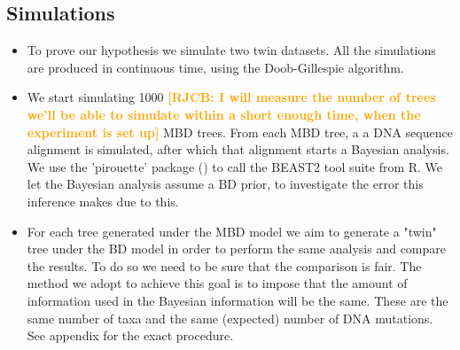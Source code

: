 \documentclass{article}
\newcommand*\richel[1]{\textcolor{orange}{\textbf{[RJCB: #1]}}}
\begin{document}
\subsection{Simulations}
\begin{itemize}

\item To prove our hypothesis we simulate two twin datasets. All the simulations are produced in continuous time, using the Doob-Gillespie algorithm. 

\item We start simulating 1000 \richel{I will measure the number of trees we'll be able to simulate within a short enough time, when the experiment is set up} MBD trees. From each MBD tree, a a DNA sequence alignment is simulated, after
which that alignment starts a Bayesian analysis. We use 
the 'pirouette' package (\cite{pirouette}) to call the BEAST2 tool 
suite from R. We let the Bayesian analysis assume a BD prior, to investigate
the error this inference makes due to this.

\item For each tree 
generated under the MBD model we aim to generate a "twin" tree under the BD model in order to perform the same analysis and compare the results. To do so we need to be sure that the comparison is fair. The method we adopt to achieve this goal is to impose that the amount of information used in the Bayesian information will be the same. These are the same number of taxa and the same (expected) 
number of DNA mutations. See appendix for the exact procedure.


\end{itemize}
\end{document}
